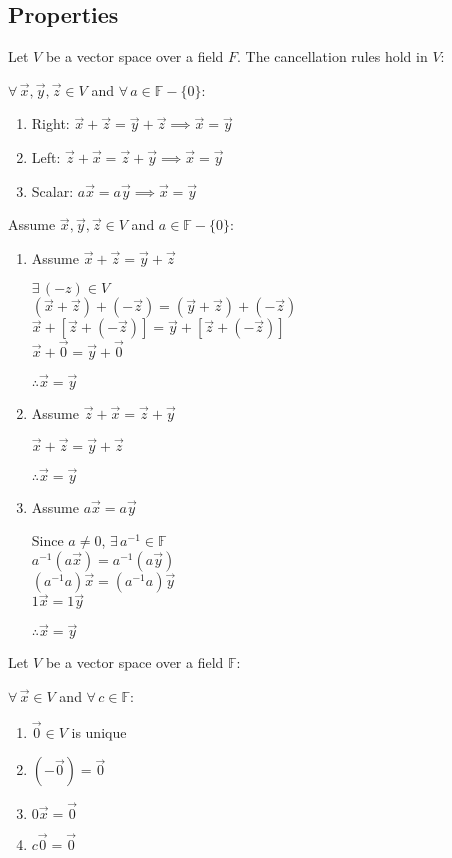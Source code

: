 \documentclass[letterpaper,12pt,fleqn]{article}
\newcommand{\vx}{\vec{x}}
\newcommand{\vy}{\vec{y}}
\newcommand{\vz}{\vec{z}}
\newcommand{\vi}{\vec{0}}
\newcommand{\F}{\mathbb{F}}
\begin{document}
\newpage

\subsection*{Properties}

\begin{theorem}
  Let $V$ be a vector space over a field $F$. The cancellation rules hold in $V$:

  $\forall\,\vx,\vy,\vz\in V$ and $\forall\,a\in\F-\{0\}$:
  \begin{enumerate}
  \item Right: $\vx+\vz=\vy+\vz\implies\vx=\vy$
  \item Left: $\vz+\vx=\vz+\vy\implies\vx=\vy$
  \item Scalar: $a\vx=a\vy\implies\vx=\vy$
  \end{enumerate}
\end{theorem}

\begin{theproof}
  Assume $\vx,\vy,\vz\in V$ and $a\in\F-\{0\}$:
  \begin{enumerate}
  \item Assume $\vx+\vz=\vy+\vz$

    $\exists\,(-z)\in V$ \\
    $(\vx+\vz)+(-\vz)=(\vy+\vz)+(-\vz)$ \\
    $\vx+[\vz+(-\vz)]=\vy+[\vz+(-\vz)]$ \\
    $\vx+\vi=\vy+\vi$
    
    $\therefore\vx=\vy$

  \item Assume $\vz+\vx=\vz+\vy$

    $\vx+\vz=\vy+\vz$

    $\therefore \vx=\vy$

  \item Assume $a\vx=a\vy$

    Since $a\ne0$, $\exists\,a^{-1}\in\F$ \\
    $a^{-1}(a\vx)=a^{-1}(a\vy)$ \\
    $(a^{-1}a)\vx=(a^{-1}a)\vy$ \\
    $1\vx=1\vy$

    $\therefore\vx=\vy$
  \end{enumerate}
\end{theproof}

\newpage

\begin{theorem}[Zero]
  Let $V$ be a vector space over a field $\F$:
  
  $\forall\,\vx\in V$ and $\forall\,c\in\F$:
  \begin{enumerate}
  \item $\vi\in V$ is unique
  \item $(-\vi)=\vi$
  \item $0\vx=\vi$
  \item $c\vi=\vi$
  \end{enumerate}
\end{theorem}
\end{document}
